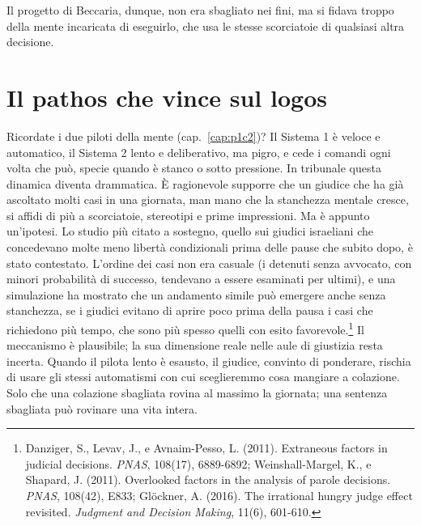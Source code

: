 Il progetto di Beccaria, dunque, non era sbagliato nei fini, ma si fidava troppo della mente incaricata di eseguirlo, che usa le stesse scorciatoie di qualsiasi altra decisione.

\section{Il pathos che vince sul logos}

Ricordate i due piloti della mente (cap.~\ref{cap:p1c2})? Il Sistema 1 \`{e} veloce e automatico, il Sistema 2 lento e deliberativo, ma pigro, e cede i comandi ogni volta che pu\`{o}, specie quando \`{e} stanco o sotto pressione. In tribunale questa dinamica diventa drammatica. \`{E} ragionevole supporre che un giudice che ha gi\`{a} ascoltato molti casi in una giornata, man mano che la stanchezza mentale cresce, si affidi di pi\`{u} a scorciatoie, stereotipi e prime impressioni. Ma è appunto un'ipotesi. Lo studio più citato a sostegno, quello sui giudici israeliani che concedevano molte meno libertà condizionali prima delle pause che subito dopo, è stato contestato. L'ordine dei casi non era casuale (i detenuti senza avvocato, con minori probabilità di successo, tendevano a essere esaminati per ultimi), e una simulazione ha mostrato che un andamento simile può emergere anche senza stanchezza, se i giudici evitano di aprire poco prima della pausa i casi che richiedono più tempo, che sono più spesso quelli con esito favorevole.\footnote{Danziger, S., Levav, J., e Avnaim-Pesso, L. (2011). Extraneous factors in judicial decisions. \textit{PNAS}, 108(17), 6889-6892; Weinshall-Margel, K., e Shapard, J. (2011). Overlooked factors in the analysis of parole decisions. \textit{PNAS}, 108(42), E833; Glöckner, A. (2016). The irrational hungry judge effect revisited. \textit{Judgment and Decision Making}, 11(6), 601-610.} Il meccanismo è plausibile; la sua dimensione reale nelle aule di giustizia resta incerta. Quando il pilota lento \`{e} esausto, il giudice, convinto di ponderare, rischia di usare gli stessi automatismi con cui sceglieremmo cosa mangiare a colazione. Solo che una colazione sbagliata rovina al massimo la giornata; una sentenza sbagliata pu\`{o} rovinare una vita intera.

